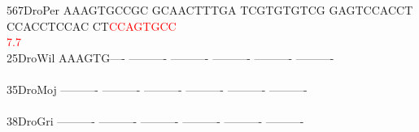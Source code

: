 \documentclass[11pt,twoside,reqno,a4paper]{article}
\begin{document}
{567\hspace*{2\charwidth}DroPer	AAAGTGCCGC	GCAACTTTGA	TCGTGTGTCG	GAGTCCACCT	CCACCTCCAC	CT\textcolor{Red}{C}\textcolor{Red}{C}\textcolor{Red}{A}\textcolor{Red}{G}\textcolor{Red}{T}\textcolor{Red}{G}\textcolor{Red}{C}\textcolor{Red}{C}	\\
\hspace*{5\charwidth}\hspace*{7\charwidth}\hspace*{1\charwidth}\hspace*{1\charwidth}\hspace*{1\charwidth}\hspace*{1\charwidth}\hspace*{1\charwidth}\hspace*{52\charwidth}\textcolor{Red}{7.7}\hspace*{1\charwidth}\\
25\hspace*{3\charwidth}DroWil	AAAGTG----	----------	----------	----------	----------	----------	\\
\hspace*{5\charwidth}\hspace*{7\charwidth}\hspace*{1\charwidth}\hspace*{1\charwidth}\hspace*{1\charwidth}\hspace*{1\charwidth}\hspace*{1\charwidth}\hspace*{1\charwidth}\\
35\hspace*{3\charwidth}DroMoj	----------	----------	----------	----------	----------	----------	\\
\hspace*{5\charwidth}\hspace*{7\charwidth}\hspace*{1\charwidth}\hspace*{1\charwidth}\hspace*{1\charwidth}\hspace*{1\charwidth}\hspace*{1\charwidth}\hspace*{1\charwidth}\\
38\hspace*{3\charwidth}DroGri	----------	----------	----------	----------	----------	----------	\\
\hspace*{5\charwidth}\hspace*{7\charwidth}\hspace*{1\charwidth}\hspace*{1\charwidth}\hspace*{1\charwidth}\hspace*{1\charwidth}\hspace*{1\charwidth}\hspace*{1\charwidth}\\
}
\end{document}
